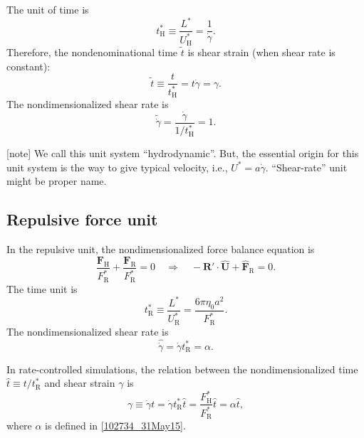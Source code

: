 \documentclass[fontsize=11pt]{scrartcl}
\begin{document}
The unit of time is
\begin{equation}
 t_{\mathrm{H}}^{\ast} \equiv \frac{L^{\ast}}{U_{\mathrm{H}}^{\ast}}
  = \frac{1}{\dot{\gamma}}.
\end{equation}
Therefore, the nondenominational time $\tilde{t}$
is shear strain (when shear rate is constant):
\begin{equation} 
 \tilde{t} \equiv \frac{t}{t_{\mathrm{H}}^{\ast}} = t \dot{\gamma}
   = \gamma.
\end{equation}
%
The nondimensionalized shear rate is
\begin{equation}
 \tilde{\dot{\gamma}}
  =
  \frac{ \dot{\gamma}}{1/t_{\mathrm{H}}^{\ast}}
   = 1.
\end{equation}


[note]
We call this unit system ``hydrodynamic''.
But, the essential origin for this unit system
is the way to give typical velocity,
i.e., $U^{\ast} = a \dot{\gamma}$.
%
``Shear-rate'' unit might be proper name.


\subsection*{Repulsive force unit}

In the repulsive unit,
the nondimensionalized
force balance equation is
\begin{equation}
 \frac{\bm{F}_{\mathrm{H}}}{F^{\ast}_{\mathrm{R}}}
  +
  \frac{\bm{F}_{\mathrm{R}}}{F^{\ast}_{\mathrm{R}}}  = 0
      \quad
  \Longrightarrow
    \quad
    - \bm{R}' \cdot \hat{\bm{U}} +
    \hat{\bm{F}}_{\mathrm{R}} = 0.
\end{equation}
The time unit is
\begin{equation}
 t_{\mathrm{R}}^{\ast}
  \equiv \frac{L^{\ast}}{U_{\mathrm{R}}^{\ast}}
  = \frac{6 \pi \eta_0 a^2}{F_{\mathrm{R}}^{\ast}}.
\end{equation}
%
The nondimensionalized shear rate is
\begin{equation}
 \hat{\dot{\gamma}} =
  \dot{\gamma} t_{\mathrm{R}}^{\ast}
  = \alpha.
\end{equation}



In rate-controlled simulations,
the relation between
the nondimensionalized time
$\hat{t} \equiv t /t_{\mathrm{R}}^{\ast}$
and shear strain $\gamma$ is
\begin{equation}
 \gamma
  \equiv \dot{\gamma} t 
  = \dot{\gamma} t_{\mathrm{R}}^{\ast} \hat{t} 
   = 
\frac{F_{\mathrm{H}}^{\ast}}{F_{\mathrm{R}}^{\ast}}
\hat{t} = \alpha \hat{t},
\end{equation}
where $\alpha$ is defined in \eqref{102734_31May15}.
\end{document}
